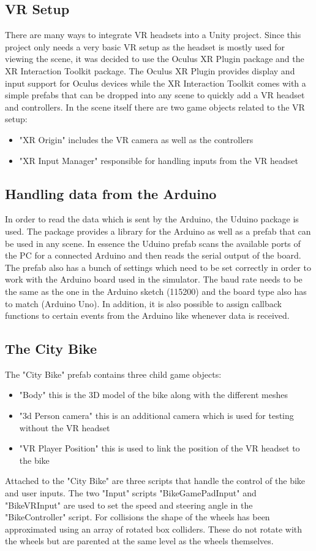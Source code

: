 \documentclass[english,notitlepage,smartquotes]{hgbreport}
\begin{document}
\subsection{VR Setup}
There are many ways to integrate VR headsets into a Unity project. Since this project only needs a very basic VR setup as the headset is mostly used for viewing the scene, it was decided to use the Oculus XR Plugin package and the XR Interaction Toolkit package. 
The Oculus XR Plugin provides display and input support for Oculus devices while the XR Interaction Toolkit comes with a simple prefabs that can be dropped into any scene to quickly add a VR headset and controllers. 
In the scene itself there are two game objects related to the VR setup: 
\begin{itemize}
	\item "XR Origin" includes the VR camera as well as the controllers
	\item "XR Input Manager" responsible for handling inputs from the VR headset
\end{itemize}
\subsection{Handling data from the Arduino}
In order to read the data which is sent by the Arduino, the Uduino package is used.
The package provides a library for the Arduino as well as a prefab that can be used in any scene. 
In essence the Uduino prefab scans the available ports of the PC for a connected Arduino and then reads the serial output of the board. The prefab also has a bunch of settings which need to be set correctly in order to work with the Arduino board used in the simulator.
The baud rate needs to be the same as the one in the Arduino sketch (115200) and the board type also has to match (Arduino Uno).
In addition, it is also possible to assign callback functions to certain events from the Arduino like whenever data is received.
\subsection{The City Bike}
The "City Bike" prefab contains three child game objects:
\begin{itemize}
	\item "Body" this is the 3D model of the bike along with the different meshes
	\item "3d Person camera" this is an additional camera which is used for testing without the VR headset
	\item "VR Player Position" this is used to link the position of the VR headset to the bike
\end{itemize}
Attached to the "City Bike" are three scripts that handle the control of the bike and user inputs.
The two "Input" scripts "BikeGamePadInput" and "BikeVRInput" are used to set the speed and steering angle in the "BikeController" script.
For collisions the shape of the wheels has been approximated using an array of rotated box colliders. These do not rotate with the wheels but are parented at the same level as the wheels themselves.
\end{document}
